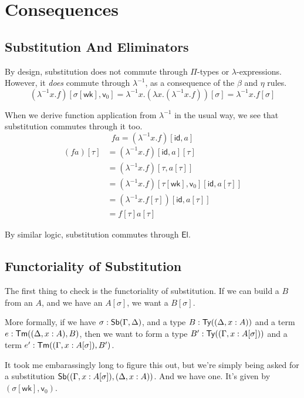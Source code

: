 \documentclass{article}
\begin{document}
\section{Consequences}

\subsection{Substitution And Eliminators}

By design, substitution does not commute through \(\Pi\)-types or \(\lambda\)-expressions.
However, it \emph{does} commute through \(\lambda^{-1}\), as a consequence of the \(\beta\) and \(\eta\) rules.
\[(\lambda^{-1} x. f)[\sigma[\mathsf{wk}],\mathsf{v}_0]
= \lambda^{-1} x. (\lambda x. (\lambda^{-1} x. f))[\sigma]
= \lambda^{-1} x. f[\sigma]
\]

When we derive function application from \(\lambda^{-1}\) in the usual way, we see that substitution commutes through it too.
\[f a = (\lambda^{-1} x. f)[\mathsf{id},a]\]
\begin{align*}
    (f a)[\tau] &= (\lambda^{-1} x. f)[\mathsf{id},a][\tau]
    \\ &= (\lambda^{-1} x. f)[\tau,a[\tau]]
    \\ &= (\lambda^{-1} x. f)[\tau[\mathsf{wk}],\mathsf{v}_0][\mathsf{id},a[\tau]]
    \\ &= (\lambda^{-1} x. f[\tau])[\mathsf{id},a[\tau]]
    \\ &= f[\tau] a[\tau]
\end{align*}

By similar logic, substitution commutes through \(\mathsf{El}\).

\subsection{Functoriality of Substitution}

The first thing to check is the functoriality of substitution.
If we can build a \(B\) from an \(A\), and we have an \(A[\sigma]\), we want a \(B[\sigma]\).

More formally, if we have \(\sigma : \mathsf{Sb}(\Gamma,\Delta)\),
and a type \(B : \mathsf{Ty}((\Delta, x : A))\) and a term \(e : \mathsf{Tm}((\Delta, x : A), B)\),
then we want to form a type \(B' : \mathsf{Ty}((\Gamma, x : A[\sigma]))\)
and a term \(e' : \mathsf{Tm}((\Gamma, x : A[\sigma]), B')\).

It took me embarassingly long to figure this out, but we're simply being asked for a substitution
\(\mathsf{Sb}((\Gamma, x : A[\sigma]), (\Delta, x : A))\).
And we have one. It's given by \((\sigma[\mathsf{wk}],\mathsf{v}_0)\).
\end{document}

